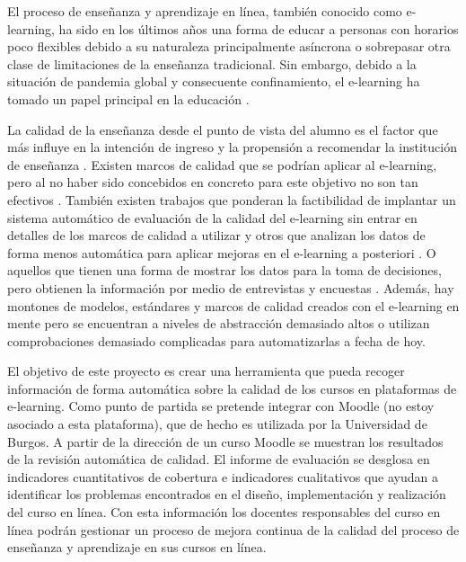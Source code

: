 
El proceso de enseñanza y aprendizaje en línea, también conocido como e-learning, ha sido en los últimos años una forma de educar a personas con horarios poco flexibles debido a su naturaleza principalmente asíncrona o sobrepasar otra clase de limitaciones de la enseñanza tradicional. Sin embargo, debido a la situación de pandemia global y consecuente confinamiento, el e-learning ha tomado un papel principal en la educación \cite{muhammad2020hierarchical}.

La calidad de la enseñanza desde el punto de vista del alumno es el factor que más influye en la intención de ingreso y la propensión a recomendar la institución de enseñanza \cite{martinez2016perceived}.
Existen marcos de calidad que se podrían aplicar al e-learning, pero al no haber sido concebidos en concreto para este objetivo no son tan efectivos \cite{muhammad2020hierarchical}.
También existen trabajos que ponderan la factibilidad de implantar un sistema automático de evaluación de la calidad del e-learning sin entrar en detalles de los marcos de calidad a utilizar \cite{doneva2015automated} y otros que analizan los datos de forma menos automática para aplicar mejoras en el e-learning a posteriori \cite{ueda2017data}. O aquellos que tienen una forma de mostrar los datos para la toma de decisiones, pero obtienen la información por medio de entrevistas y encuestas \cite{mejia2020dashboard}.
Además, hay montones de modelos, estándares y marcos de calidad creados con el e-learning en mente pero se encuentran a niveles de abstracción demasiado altos o utilizan comprobaciones demasiado complicadas para automatizarlas a fecha de hoy.

El objetivo de este proyecto es crear una herramienta que pueda recoger información de forma automática sobre la calidad de los cursos en plataformas de e-learning. Como punto de partida se pretende integrar con Moodle (no estoy asociado a esta plataforma), que de hecho es utilizada por la Universidad de Burgos. A partir de la dirección de un curso Moodle se muestran los resultados de la revisión automática de calidad. El informe de evaluación se desglosa en indicadores cuantitativos de cobertura e indicadores cualitativos que ayudan a identificar los problemas encontrados en el diseño, implementación y realización del curso en línea. Con esta información los docentes responsables del curso en línea podrán gestionar un proceso de mejora continua de la calidad del proceso de enseñanza y aprendizaje en sus cursos en línea.
